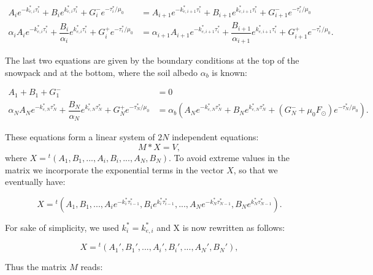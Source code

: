 \documentclass[a4paper,11pt]{article}
\begin{document}
\begin{align}
A_i e^{-k_{e,i}^* \tau_i^*} + B_i e^{k_{e,i}^* \tau_i^*} + G_i^{-}e^{-\tau_i^*/\mu_0} & =A_{i+1} e^{-k_{e,i+1}^* \tau_i^*} + B_{i+1} e^{k_{e,i+1}^* \tau_i^*} + G_{i+1}^{-} e^{-\tau_i^*/\mu_0}\\
\alpha_i A_i e^{-k_{e,i}^* \tau_i^*} + \dfrac{B_i}{\alpha_i} e^{k_{e,i}^* \tau_i^*} + G_i^{+}e^{-\tau_i^* /\mu_0} &=\alpha_{i+1} A_{i+1} e^{-k_{e,i+1}^* \tau_i^*} + \dfrac{B_{i+1}}{\alpha_{i+1}} e^{k_{e,i+1}^* \tau_i^*} + G_{i+1}^{+}e^{-\tau_{i}^* /\mu_0}.
\end{align}

The last two equations are given by the boundary conditions at the top of the snowpack and at the bottom, where the soil albedo $\alpha_b$ is known:

\begin{align}
A_1 + B_1 + G_{1}^{-} &= 0 \\
\alpha_N A_N e^{-k_{e,N}^* \tau_N^*} + \dfrac{B_N}{\alpha_N} e^{k_{e,N}^* \tau_N^*} + G_{N}^{+}e^{-\tau_{N}^* /\mu_0} &=\alpha_{b} \left(A_{N} e^{-k_{e,N}^* \tau_N^*} + B_{N} e^{k_{e,N}^* \tau_N^*}  + (G_{N}^{-}+\mu_0 F_\odot)e^{-\tau_{N}^* /\mu_0}\right).
\end{align}

These equations form a linear system of $2N$ independent equations:
\begin{equation}
M*X=V,
\end{equation}
where $X={}^t(A_1,B_1,...,A_i,B_i,...,A_N,B_N)$. To avoid extreme values in the matrix we incorporate the exponential terms in the vector $X$, so that we eventually have:

\begin{equation}
X={}^t(A_1,B_1,...,A_ie^{-k_{i}^*\tau_{i-1}^*},B_i e^{k_{i}^*\tau_{i-1}^*},...,A_N e^{-k_{N}^*\tau_{N-1}^*},B_{N}e^{k_{N}^*\tau_{N-1}^*}).
\end{equation}

For sake of simplicity, we used $k_i^*=k_{e,i}^*$ and X is now rewritten as follows:

\begin{equation}
X={}^t(A_1',B_1',...,A_i',B_i',...,A_N',B_{N}'),
\end{equation}

\noindent Thus the matrix $M$ reads:
\end{document}
